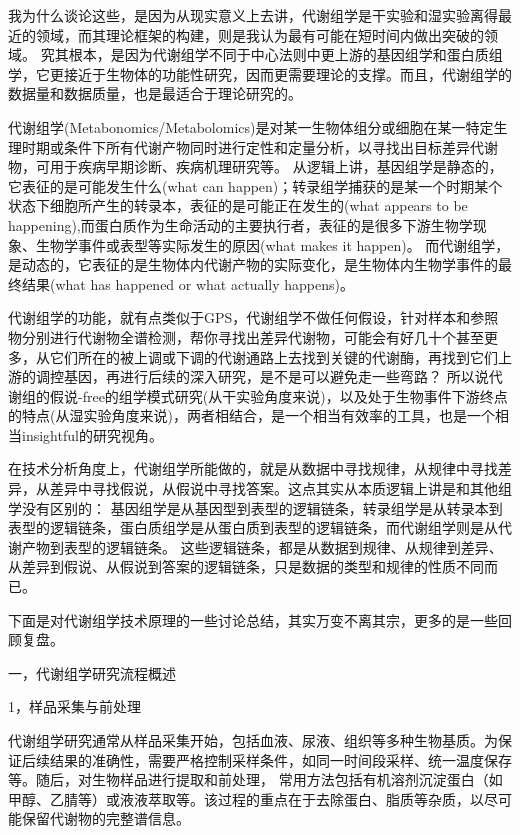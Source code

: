 \documentclass[12pt,hyperref,a4paper,UTF8]{ctexart}
\begin{document}
我为什么谈论这些，是因为从现实意义上去讲，代谢组学是干实验和湿实验离得最近的领域，而其理论框架的构建，则是我认为最有可能在短时间内做出突破的领域。
究其根本，是因为代谢组学不同于中心法则中更上游的基因组学和蛋白质组学，它更接近于生物体的功能性研究，因而更需要理论的支撑。而且，代谢组学的数据量和数据质量，也是最适合于理论研究的。

代谢组学(Metabonomics/Metabolomics)是对某一生物体组分或细胞在某一特定生理时期或条件下所有代谢产物同时进行定性和定量分析，以寻找出目标差异代谢物，可用于疾病早期诊断、疾病机理研究等。
从逻辑上讲，基因组学是静态的，它表征的是可能发生什么(what can happen)；转录组学捕获的是某一个时期某个状态下细胞所产生的转录本，表征的是可能正在发生的(what appears to be happening),而蛋白质作为生命活动的主要执行者，表征的是很多下游生物学现象、生物学事件或表型等实际发生的原因(what makes it happen)。
而代谢组学，是动态的，它表征的是生物体内代谢产物的实际变化，是生物体内生物学事件的最终结果(what has happened or what actually happens)。

代谢组学的功能，就有点类似于GPS，代谢组学不做任何假设，针对样本和参照物分别进行代谢物全谱检测，帮你寻找出差异代谢物，可能会有好几十个甚至更多，从它们所在的被上调或下调的代谢通路上去找到关键的代谢酶，再找到它们上游的调控基因，再进行后续的深入研究，是不是可以避免走一些弯路？
所以说代谢组的假说-free的组学模式研究(从干实验角度来说)，以及处于生物事件下游终点的特点(从湿实验角度来说)，两者相结合，是一个相当有效率的工具，也是一个相当insightful的研究视角。

在技术分析角度上，代谢组学所能做的，就是从数据中寻找规律，从规律中寻找差异，从差异中寻找假说，从假说中寻找答案。这点其实从本质逻辑上讲是和其他组学没有区别的：
基因组学是从基因型到表型的逻辑链条，转录组学是从转录本到表型的逻辑链条，蛋白质组学是从蛋白质到表型的逻辑链条，而代谢组学则是从代谢产物到表型的逻辑链条。
这些逻辑链条，都是从数据到规律、从规律到差异、从差异到假说、从假说到答案的逻辑链条，只是数据的类型和规律的性质不同而已。

下面是对代谢组学技术原理的一些讨论总结，其实万变不离其宗，更多的是一些回顾复盘。

一，代谢组学研究流程概述

1，样品采集与前处理

代谢组学研究通常从样品采集开始，包括血液、尿液、组织等多种生物基质。为保证后续结果的准确性，需要严格控制采样条件，如同一时间段采样、统一温度保存等。随后，对生物样品进行提取和前处理，
常用方法包括有机溶剂沉淀蛋白（如甲醇、乙腈等）或液液萃取等。该过程的重点在于去除蛋白、脂质等杂质，以尽可能保留代谢物的完整谱信息\cite{3}。
\end{document}
